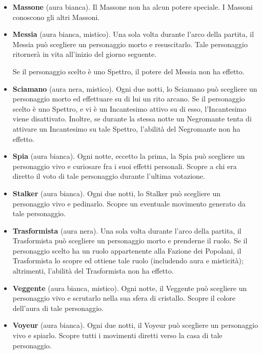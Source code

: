 \documentclass[a4paper,10pt]{article}
\begin{document}
\begin{itemize}
	\item {\bf Massone} (aura bianca). Il Massone non ha alcun potere speciale. I Massoni conoscono gli altri Massoni.
 
	\item {\bf Messia} (aura bianca, mistico). Una sola volta durante l'arco della partita, il Messia può scegliere un personaggio morto e resuscitarlo. Tale personaggio ritornerà in vita all'inizio del giorno seguente.
 
	 Se il personaggio scelto è uno Spettro, il potere del Messia non ha effetto.

	\item{\bf Sciamano} (aura nera, mistico). Ogni due notti, lo Sciamano può scegliere un personaggio morto ed effettuare su di lui un rito arcano. Se il personaggio scelto è uno Spettro, e vi è un Incantesimo attivo su di esso, l'Incantesimo viene disattivato. Inoltre, se durante la stessa notte un Negromante tenta di attivare un Incantesimo su tale Spettro, l'abilità del Negromante non ha effetto.
	
	\item {\bf Spia} (aura bianca). Ogni notte, eccetto la prima, la Spia può scegliere un personaggio vivo e curiosare fra i suoi effetti personali. Scopre a chi era diretto il voto di tale personaggio durante l'ultima votazione.

	\item {\bf Stalker} (aura bianca). Ogni due notti, lo Stalker può scegliere un personaggio vivo e pedinarlo. Scopre un eventuale movimento generato da tale personaggio.
	
	\item {\bf Trasformista} (aura nera). Una sola volta durante l'arco della partita, il Trasformista può scegliere un personaggio morto e prenderne il ruolo. Se il personaggio scelto ha un ruolo appartenente alla Fazione dei Popolani, il Trasformista lo scopre ed ottiene tale ruolo (includendo aura e misticità); altrimenti, l'abilità del Trasformista non ha effetto.
	
	\item {\bf Veggente} (aura bianca, mistico). Ogni notte, il Veggente può scegliere un personaggio vivo e scrutarlo nella sua sfera di cristallo. Scopre il colore dell'aura di tale personaggio.

	\item {\bf Voyeur} (aura bianca). Ogni due notti, il Voyeur può scegliere un personaggio vivo e spiarlo. Scopre tutti i movimenti diretti verso la casa di tale personaggio.
	
\end{itemize}
\end{document}
